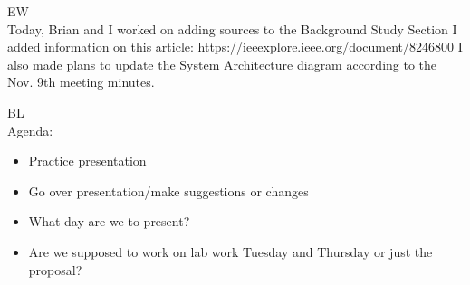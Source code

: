 \documentclass[fontsize=11pt, %
                             paper=letter, %
                             openany, %
                             captions=tableheading,
                             index=totoc,
                             hyperref]{labbook}
\begin{document}
EW\\
Today, Brian and I worked on adding sources to the Background Study Section I added information on this article:
https://ieeexplore.ieee.org/document/8246800
I also made plans to update the System Architecture diagram according to the Nov. 9th meeting minutes.

BL\\
Agenda:
\begin{itemize}
\item Practice presentation
\item Go over presentation/make suggestions or changes
\item What day are we to present?
\item Are we supposed to work on lab work Tuesday and Thursday or just the proposal?
\end{itemize}
\end{document}
